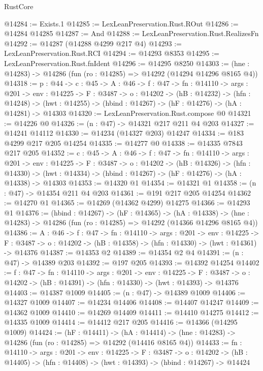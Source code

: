 \begin{lexlean}{RustCore}
\begin{coremodule}
@14284 := Exists.{1}
@14285 := LexLeanPreservation.Rust.ROut
@14286 := @14284 @14285
@14287 := And
@14288 := LexLeanPreservation.Rust.RealizesFn
@14292 := @14287 (@14288 @4299 @217 @4)
@14293 := LexLeanPreservation.Rust.RCI
@14294 := @14293 @8353
@14295 := LexLeanPreservation.Rust.fnIdent
@14296 := @14295 @8250
@14303 := (hne : @14283) -> @14286 (fun (ro : @14285) => @14292 (@14294 @14296 @8165 @4))
@14318 := {p : @44} ->
  {c : @45} ->
  {A : @46} ->
  {f : @47} ->
  {fn : @14110} ->
  {args : @201} ->
  {env : @14225} ->
  {F : @3487} ->
  {o : @14202} ->
  (hB : @14232) ->
  (hfn : @14248) -> (hwt : @14255) -> (hbind : @14267) -> (hF : @14276) -> (hA : @14281) -> @14303
@14320 := LexLeanPreservation.Rust.compose @0
@14321 := @14226 @0
@14326 := (n : @47) -> @14321 @217 @211 @4 @203
@14327 := @14241 @14112
@14330 := @14234 (@14327 @203) @14247
@14334 := @183 @4299 @217 @205 @14254
@14335 := @14277 @0
@14338 := @14335 @7843 @217 @205
@14352 := {c : @45} ->
  {A : @46} ->
  {f : @47} ->
  {fn : @14110} ->
  {args : @201} ->
  {env : @14225} ->
  {F : @3487} ->
  {o : @14202} ->
  (hB : @14326) ->
  (hfn : @14330) -> (hwt : @14334) -> (hbind : @14267) -> (hF : @14276) -> (hA : @14338) -> @14303
@14353 := @14320 @1
@14354 := @14321 @1
@14358 := (n : @47) -> @14354 @211 @4 @203
@14361 := @191 @217 @205 @14254
@14362 := @14270 @1
@14365 := @14269 (@14362 @4299) @14275
@14366 := @14293 @1
@14376 := (hbind : @14267) ->
  (hF : @14365) ->
  (hA : @14338) -> (hne : @14283) -> @14286 (fun (ro : @14285) => @14292 (@14366 @14296 @8165 @4))
@14386 := {A : @46} ->
  {f : @47} ->
  {fn : @14110} ->
  {args : @201} ->
  {env : @14225} ->
  {F : @3487} -> {o : @14202} -> (hB : @14358) -> (hfn : @14330) -> (hwt : @14361) -> @14376
@14387 := @14353 @2
@14389 := @14354 @2 @4
@14391 := (n : @47) -> @14389 @203
@14392 := @197 @205
@14393 := @14392 @14254
@14402 := {f : @47} ->
  {fn : @14110} ->
  {args : @201} ->
  {env : @14225} ->
  {F : @3487} -> {o : @14202} -> (hB : @14391) -> (hfn : @14330) -> (hwt : @14393) -> @14376
@14403 := @14387 @1009
@14405 := (n : @47) -> @14389 @1009
@14406 := @14327 @1009
@14407 := @14234 @14406
@14408 := @14407 @14247
@14409 := @14362 @1009
@14410 := @14269 @14409
@14411 := @14410 @14275
@14412 := @14335 @1009
@14414 := @14412 @217 @205
@14416 := @14366 (@14295 @1009)
@14424 := (hF : @14411) ->
  (hA : @14414) -> (hne : @14283) -> @14286 (fun (ro : @14285) => @14292 (@14416 @8165 @4))
@14433 := {fn : @14110} ->
  {args : @201} ->
  {env : @14225} ->
  {F : @3487} ->
  {o : @14202} -> (hB : @14405) -> (hfn : @14408) -> (hwt : @14393) -> (hbind : @14267) -> @14424

\end{coremodule}
\end{lexlean}
